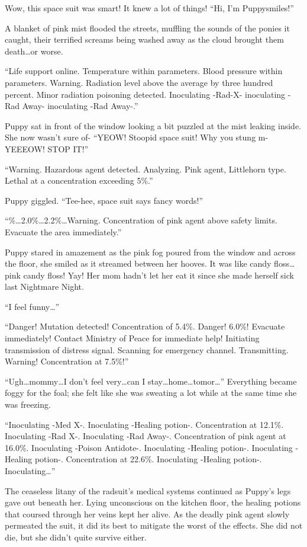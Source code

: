 Wow, this space suit was smart! It knew a lot of things! ``Hi, I'm Puppysmiles!''

A blanket of pink mist flooded the streets, muffling the sounds of the ponies it caught, their terrified screams being washed away as the cloud brought them death\dots or worse.

``{\mt Life support online. Temperature within parameters. Blood pressure within parameters. Warning. Radiation level above the average by three hundred percent. Minor radiation poisoning detected. Inoculating -Rad-X- inoculating -Rad Away- inoculating -Rad Away-.}''

Puppy sat in front of the window looking a bit puzzled at the mist leaking inside. She now wasn't sure of- ``YEOW! Stoopid space suit! Why you stung m-YEEEOW! STOP IT!''

``{\mt Warning. Hazardous agent detected. Analyzing. Pink agent, Littlehorn type. Lethal at a concentration exceeding 5\%.}''

Puppy giggled. ``Tee-hee, space suit says fancy words!''

``{\%\dots 2.0\%\dots 2.2\%\dots Warning. Concentration of pink agent above safety limits. Evacuate the area immediately.}''

Puppy stared in amazement as the pink fog poured from the window and across the floor, she smiled as it streamed between her hooves. It was like candy floss\dots pink candy floss! Yay! Her mom hadn't let her eat it since she made herself sick last Nightmare Night.

``I feel funny\dots''

``{\mt Danger! Mutation detected! Concentration of 5.4\%. Danger! 6.0\%! Evacuate immediately! Contact Ministry of Peace for immediate help! Initiating transmission of distress signal. Scanning for emergency channel. Transmitting. Warning! Concentration at 7.5\%!}''

``Ugh\dots mommy\dots I don't feel very\dots can I stay\dots home\dots tomor\dots'' Everything became foggy for the foal; she felt like she was sweating a lot while at the same time she was freezing.

``{\mt Inoculating -Med X-. Inoculating -Healing potion-. Concentration at 12.1\%. Inoculating -Rad X-. Inoculating -Rad Away-. Concentration of pink agent at 16.0\%. Inoculating -Poison Antidote-. Inoculating -Healing potion-. Inoculating -Healing potion-. Concentration at 22.6\%. Inoculating -Healing potion-. Inoculating\dots}''

The ceaseless litany of the radsuit's medical systems continued as Puppy's legs gave out beneath her. Lying unconscious on the kitchen floor, the healing potions that coursed through her veins kept her alive. As the deadly pink agent slowly permeated the suit, it did its best to mitigate the worst of the effects. She did not die, but she didn't quite survive either.

